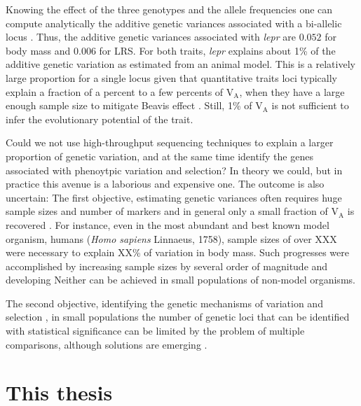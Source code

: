 Knowing the effect of the three genotypes and the allele frequencies one can compute analytically the additive genetic variances associated with a bi-allelic locus \parencite[][p77]{Fisher1941average,Lynch1998}. Thus, the additive genetic variances associated with \emph{lepr} are $0.052$  for body mass and $0.006$ for LRS. For both traits, \emph{lepr} explains about 1\% of the additive genetic variation as estimated from an animal model. This is a relatively large proportion for a single locus given that quantitative traits loci typically explain a fraction of a percent to a few percents of V$_\text{A}$, when they have a large enough sample size to mitigate Beavis effect \parencite{Flint2009,Jensen2014}.  Still, 1\% of V$_\text{A}$ is not sufficient to infer the evolutionary potential of the trait.

Could we not use high-throughput sequencing techniques to explain a larger proportion of genetic variation, and at the same time identify the genes associated with phenoytpic variation and selection? 
In theory we could, but in practice this avenue is a laborious and expensive one. The outcome is also uncertain: 
The first objective, estimating genetic variances often requires huge sample sizes and number of markers and in general only a small fraction of V$_\text{A}$ is recovered \parencite{Bloom2013}. For instance, even in the most abundant and best known model organism, humans (\textit{Homo sapiens} Linnaeus, 1758), 
sample sizes of over XXX were necessary to explain 
XX\% of variation in body mass. 
Such progresses were accomplished by increasing sample sizes by several order of magnitude and developing 
Neither can be achieved in small populations of non-model organisms.

The second objective, identifying the genetic mechanisms of variation and selection , in small populations the number of genetic loci that can be identified with statistical significance can be limited by the problem of multiple comparisons, although solutions are emerging . 



\section{This thesis}

